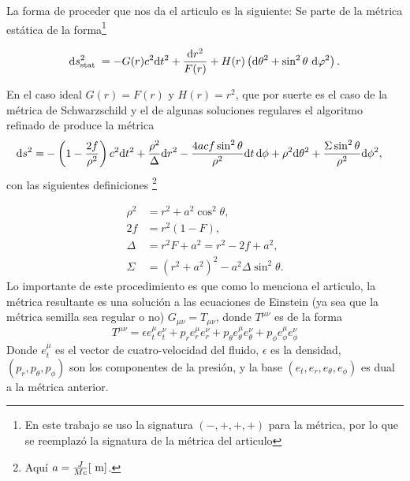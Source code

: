 La forma de proceder que nos da el articulo es la siguiente:
Se parte de la métrica estática de la forma\footnote{En este trabajo se uso la signatura $(-,+,+,+)$ para la métrica, por lo que se reemplazó la signatura de la métrica del articulo }

\begin{equation}
    \mathrm{d} s_{\text {stat }}^2 = - G(r) c^2 \mathrm{d} t^2+\frac{\mathrm{d} r^2}{F(r)}+H(r)\left(\mathrm{d} \theta^2+\sin ^2 \theta \mathrm{~d} \varphi^2\right).
\end{equation}

En el caso ideal $G(r)=F(r)$ y $H(r)=r^2$, que por suerte es el caso de la métrica de Schwarzschild y el de algunas soluciones regulares  el  algoritmo refinado de \cite{azreg-ainou-2014} produce la métrica
\begin{align}
    \mathrm{d}s^2 = &
    - \left(1 - \frac{2f}{\rho^2}\right) c^2 \mathrm{d}t^2
    + \frac{\rho^2}{\Delta} \mathrm{d}r^2
    - \frac{4acf \sin^2\theta}{\rho^2} \mathrm{d}t\, \mathrm{d}\phi
    + \rho^2 \mathrm{d}\theta^2
    + \frac{\Sigma \sin^2\theta}{\rho^2} \mathrm{d}\phi^2,
    \label{eq:metricGeneratedByNewmanJanis}
\end{align}
con las siguientes definiciones \footnote{Aquí  $a=\frac{J}{M c} [\mathrm{~m}]$.}

\begin{align}
    \rho^2 & =r^2+a^2 \cos ^2 \theta,                            \\
    2 f    & =r^2(1-F),                                          \\
    \Delta & =r^2 F+a^2=r^2-2 f+a^2,                             \\
    \Sigma & =\left(r^2+a^2\right)^2-a^2 \Delta \sin ^2 \theta .
\end{align}
Lo importante de este procedimiento es que como lo menciona el articulo, la métrica resultante es una solución a las ecuaciones de Einstein (ya sea que la métrica semilla sea regular o no) $G_{\mu \nu}=T_{\mu \nu}$, donde $T^{\mu \nu}$ es de la forma
\begin{equation}
    T^{\mu \nu}=\epsilon e_t^\mu e_t^\nu+p_r e_r^\mu e_r^\nu+p_\theta e_\theta^\mu e_\theta^\nu+p_\phi e_\phi^\mu e_\phi^\nu
\end{equation}
Donde $e_t^\mu$ es el vector de cuatro-velocidad del fluido, $\epsilon$ es la densidad, $\left(p_r, p_\theta, p_\phi\right)$ son los componentes de la presión, y la base $\left(e_t, e_r, e_\theta, e_\phi\right)$ es dual a la métrica anterior.

